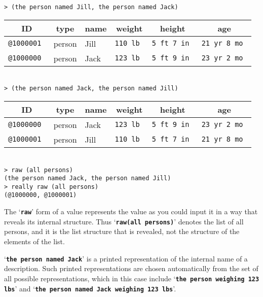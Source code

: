 \documentclass[12pt]{article}
\newcommand{\TT}[1]{{\tt \bfseries #1}}
\newenvironment{indpar}[1][0.3in]%
	{\begin{list}{}%
		     {\setlength{\itemsep}{0in}%
		      \setlength{\topsep}{0in}%
		      \setlength{\parsep}{1ex}%
		      \setlength{\labelwidth}{#1}%
		      \setlength{\leftmargin}{#1}%
		      \addtolength{\leftmargin}{\labelsep}}%
	 \item}%
	{\end{list}}
\begin{document}
\begin{indpar}
\verb|> (the person named Jill, the person named Jack)| \\
\begin{tabular}{|r|l|l|r|r|r|}
\hline
\multicolumn{1}{|c}{\bf ID} &
\multicolumn{1}{|c}{\bf type} &
\multicolumn{1}{|c}{\bf name} &
\multicolumn{1}{|c}{\bf weight} &
\multicolumn{1}{|c}{\bf height} &
\multicolumn{1}{|c|}{\bf age} \\
\hline
\tt @1000001 & person & Jill & \tt 110 lb & \tt 5 ft 7 in & \tt 21 yr 8 mo \\
\tt @1000000 & person & Jack & \tt 123 lb & \tt 5 ft 9 in & \tt 23 yr 2 mo \\
\hline
\end{tabular} \\[0.5ex]
\verb|> (the person named Jack, the person named Jill)| \\
\begin{tabular}{|r|l|l|r|r|r|}
\hline
\multicolumn{1}{|c}{\bf ID} &
\multicolumn{1}{|c}{\bf type} &
\multicolumn{1}{|c}{\bf name} &
\multicolumn{1}{|c}{\bf weight} &
\multicolumn{1}{|c}{\bf height} &
\multicolumn{1}{|c|}{\bf age} \\
\hline
\tt @1000000 & person & Jack & \tt 123 lb & \tt 5 ft 9 in & \tt 23 yr 2 mo \\
\tt @1000001 & person & Jill & \tt 110 lb & \tt 5 ft 7 in & \tt 21 yr 8 mo \\
\hline
\end{tabular} \\[0.5ex]
\verb|> raw (all persons)| \\
\verb|(the person named Jack, the person named Jill)| \\
\verb|> really raw (all persons)| \\
\verb|(@1000000, @1000001)|
\end{indpar}

The `\TT{raw}' form of a value represents the value
as you could input it in a way that reveals its internal structure.  Thus
`\TT{raw(all~persons)}' denotes the list of all persons, and it is the list
structure that is revealed, not the structure of the elements of the list.

`\TT{the person named Jack}' is a printed representation of the
internal name of a description.  Such printed representations are chosen
automatically from the set of all possible representations, which
in this case include `\TT{the person weighing 123 lbs}' and
`\TT{the person named Jack weighing 123 lbs}'.
\end{document}
